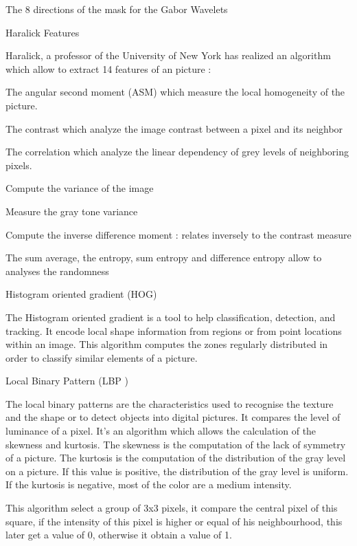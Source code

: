 The 8 directions of the mask for the Gabor Wavelets

Haralick Features

Haralick, a professor of the University of New York has realized an algorithm which allow to extract 14 features of an picture :

    The angular second moment (ASM) which measure the local homogeneity of the picture.

    The contrast which analyze the image contrast between a pixel and its neighbor

    The correlation which analyze the linear dependency of grey levels of neighboring pixels.

    Compute the variance of the image

    Measure the gray tone variance

    Compute the inverse difference moment : relates inversely to the contrast measure

    The sum average, the entropy, sum entropy and difference entropy allow to analyses the randomness

Histogram oriented gradient (HOG)

The Histogram oriented gradient is a tool to help classification, detection, and tracking. It encode local shape information from regions or from point locations within an image. This algorithm computes the zones regularly distributed in order to classify similar elements of a picture.

Local Binary Pattern (LBP )

The local binary patterns are the characteristics used to recognise the texture and the shape or to detect objects into digital pictures. It compares the level of luminance of a pixel. It’s an algorithm which allows the calculation of the skewness and kurtosis. The skewness is the computation of the lack of symmetry of a picture. The kurtosis is the computation of the distribution of the gray level on a picture. If this value is positive, the distribution of the gray level is uniform. If the kurtosis is negative, most of the color are a medium intensity.

This algorithm select a group of 3x3 pixels, it compare the central pixel of this square, if the intensity of this pixel is higher or equal of his neighbourhood, this later get a value of 0, otherwise it obtain a value of 1.
  